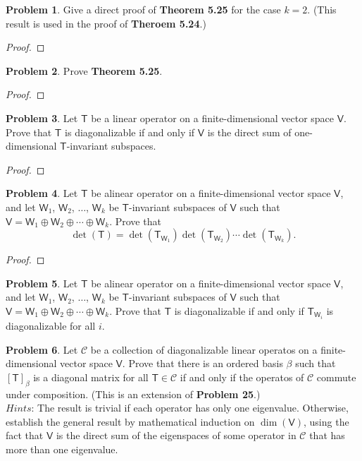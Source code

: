 \documentclass[12pt]{book}
\theoremstyle{definition}
\newtheorem{problem}{Problem}
\begin{document}
	\newpage
	\begin{problem}
		Give a direct proof of \textbf{Theorem 5.25} for the case $k=2$. (This result is used in the proof of \textbf{Theroem 5.24}.)
	\end{problem}
	\begin{proof}
	\end{proof}
	\newpage	
	\begin{problem}
		Prove \textbf{Theorem 5.25}.
	\end{problem}
	\begin{proof}
	\end{proof}
	\newpage
	\begin{problem}
		Let $\mathsf{T}$ be a linear operator on a finite-dimensional vector space $\mathsf{V}$. Prove that $\mathsf{T}$ is diagonalizable if and only if $\mathsf{V}$ is the direct sum of one-dimensional $\mathsf{T}$-invariant subspaces.
	\end{problem}
	\begin{proof}
	\end{proof}
	\newpage
	\begin{problem}
		Let $\mathsf{T}$ be alinear operator on a finite-dimensional vector space $\mathsf{V}$, and let $\mathsf{W}_1$, $\mathsf{W}_2$, $\ldots$, $\mathsf{W}_k$ be $\mathsf{T}$-invariant subspaces of $\mathsf{V}$ such that $\mathsf{V}=\mathsf{W}_1\oplus\mathsf{W}_2\oplus\cdots\oplus\mathsf{W}_k$. Prove that$$\det(\mathsf{T})=\det\left(\mathsf{T}_{\mathsf{W}_1}\right)\det\left(\mathsf{T}_{\mathsf{W}_2}\right)\cdots\det\left(\mathsf{T}_{\mathsf{W}_k}\right).$$
	\end{problem}
	\begin{proof}
	\end{proof}
	\newpage
	\begin{problem}
		Let $\mathsf{T}$ be alinear operator on a finite-dimensional vector space $\mathsf{V}$, and let $\mathsf{W}_1$, $\mathsf{W}_2$, $\ldots$, $\mathsf{W}_k$ be $\mathsf{T}$-invariant subspaces of $\mathsf{V}$ such that $\mathsf{V}=\mathsf{W}_1\oplus\mathsf{W}_2\oplus\cdots\oplus\mathsf{W}_k$. Prove that $\mathsf{T}$ is diagonalizable if and only if $\mathsf{T}_{\mathsf{W}_i}$ is diagonalizable for all $i$.
	\end{problem}
	\newpage
	\begin{problem}
		Let $\mathcal{C}$ be a collection of diagonalizable linear operatos on a finite-dimensional vector space $\mathsf{V}$. Prove that there is an ordered basis $\beta$ such that $[\mathsf{T}]_\beta$ is a diagonal matrix for all $\mathsf{T}\in\mathcal{C}$ if and only if the operatos of $\mathcal{C}$ commute under composition. (This is an extension of \textbf{Problem 25}.)\\
		$Hints$: The result is trivial if each operator has only one eigenvalue. Otherwise, establish the general result by mathematical induction on $\dim(\mathsf{V})$, using the fact that $\mathsf{V}$ is the direct sum of the eigenspaces of some operator in $\mathcal{C}$ that has more than one eigenvalue.
	\end{problem}
\end{document}
